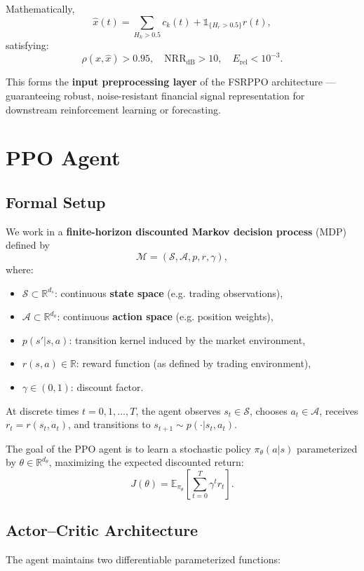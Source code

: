 \documentclass[11pt]{article}
\begin{document}
Mathematically,
\[
\boxed{
\hat{x}(t) = \sum_{H_k > 0.5} c_k(t) + \mathbb{1}_{\{H_r > 0.5\}}r(t),
}
\]
satisfying:
\[
\rho(x,\hat{x}) > 0.95,\quad \mathrm{NRR}_{\text{dB}} > 10,\quad E_{\text{rel}} < 10^{-3}.
\]

This forms the \textbf{input preprocessing layer} of the FSRPPO architecture — guaranteeing robust, noise-resistant financial signal representation for downstream reinforcement learning or forecasting.

\section{PPO Agent}

\subsection{Formal Setup}
We work in a \textbf{finite-horizon discounted Markov decision process} (MDP) defined by
\[
\mathcal{M} = (\mathcal{S}, \mathcal{A}, p, r, \gamma),
\]
where:

\begin{itemize}
  \item $\mathcal{S} \subset \mathbb{R}^{d_s}$: continuous \textbf{state space} (e.g. trading observations),
  \item $\mathcal{A} \subset \mathbb{R}^{d_a}$: continuous \textbf{action space} (e.g. position weights),
  \item $p(s'|s,a)$: transition kernel induced by the market environment,
  \item $r(s,a)\in\mathbb{R}$: reward function (as defined by trading environment),
  \item $\gamma \in (0,1)$: discount factor.
\end{itemize}

At discrete times $t = 0, 1, \dots, T$, the agent observes $s_t \in \mathcal{S}$, chooses $a_t \in \mathcal{A}$, receives $r_t = r(s_t, a_t)$, and transitions to $s_{t+1} \sim p(\cdot|s_t, a_t)$.

The goal of the PPO agent is to learn a stochastic policy $\pi_{\theta}(a|s)$ parameterized by $\theta \in \mathbb{R}^{d_\theta}$, maximizing the expected discounted return:
\[
J(\theta) = \mathbb{E}_{\pi_\theta} \left[ \sum_{t=0}^{T} \gamma^t r_t \right].
\]


\subsection{Actor–Critic Architecture}
The agent maintains two differentiable parameterized functions:
\end{document}
